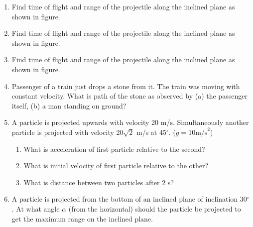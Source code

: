 \documentclass{article}
\begin{document}
\begin{enumerate}
    \item Find time of flight and range of the projectile along the inclined plane as shown in figure.
    \begin{center}
    \end{center}

    \item Find time of flight and range of the projectile along the inclined plane as shown in figure.
    \begin{center}
    \end{center}

    \item Find time of flight and range of the projectile along the inclined plane as shown in figure.
    \begin{center}
    \end{center}

    \item Passenger of a train just drops a stone from it. The train was moving with constant velocity. What is path of the stone as observed by (a) the passenger itself, (b) a man standing on ground?
    \item A particle is projected upwards with velocity 20 m/s. Simultaneously another particle is projected with velocity 20\(\sqrt{2}\) m/s at 45\(^{\circ}\). (\( g = 10 \text{m/s}^2 \))
    \begin{enumerate}
        \item What is acceleration of first particle relative to the second?
        \item What is initial velocity of first particle relative to the other?
        \item What is distance between two particles after 2 s?
    \end{enumerate}
    \item A particle is projected from the bottom of an inclined plane of inclination 30\(^{\circ}\). At what angle \( \alpha \) (from the horizontal) should the particle be projected to get the maximum range on the inclined plane.
\end{enumerate}
\end{document}
